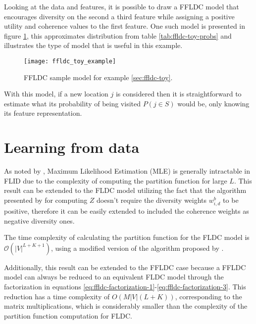 Looking at the data and features, it is possible to draw a FFLDC model that encourages diversity on the second a third feature while assigning a positive utility and coherence values to the first feature. One such model is presented in figure \ref{fig:ffldc-toy-all-weights}, this approximates distribution from table \ref{tab:ffldc-toy-probs} and illustrates the type of model that is useful in this example.

\begin{figure}
  \centering
  \texttt{[image: ffldc\_toy\_example]}
  \caption{FFLDC sample model for example \ref{sec:ffldc-toy}.}
  \label{fig:ffldc-toy-all-weights}
\end{figure}

With this model, if a new location $j$ is considered then it is straightforward to estimate what its probability of being visited $P(j \in S)$ would be, only knowing its feature representation.

\section{Learning from data}

As noted by \citet{tschiatschek16learning}, Maximum Likelihood Estimation (MLE) is generally intractable in FLID due to the complexity of computing the partition function for large $L$. This result can be extended to the FLDC model utilizing the fact that the algorithm presented by \citet{tschiatschek16learning} for computing $Z$ doesn't require the diversity weights $w^{b}_{i,d}$ to be positive, therefore it can be easily extended to included the coherence weights as negative diversity ones.

\begin{proposition}
  The time complexity of calculating the partition function for the FLDC model is $\mathcal{O}(|V|^{L+K+1})$, using a modified version of the algorithm proposed by \citep{tschiatschek16learning}.
\end{proposition}

Additionally, this result can be extended to the FFLDC case because a FFLDC model can always be reduced to an equivalent FLDC model through the factorization in equations \ref{eq:ffldc-factorization-1}-\ref{eq:ffldc-factorization-3}. This reduction has a time complexity of $O(M|V|(L+K))$, corresponding to the matrix multiplications, which is considerably smaller than the complexity of the partition function computation for FLDC.

